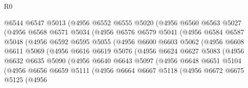 \begin{lexlean}{R0}
\begin{coremodule}
                @6544
                @6547
                @5013
                (@4956
                  @6552
                  @6555
                  @5020
                  (@4956
                    @6560
                    @6563
                    @5027
                    (@4956
                      @6568
                      @6571
                      @5034
                      (@4956
                        @6576
                        @6579
                        @5041
                        (@4956
                          @6584
                          @6587
                          @5048
                          (@4956
                            @6592
                            @6595
                            @5055
                            (@4956
                              @6600
                              @6603
                              @5062
                              (@4956
                                @6608
                                @6611
                                @5069
                                (@4956
                                  @6616
                                  @6619
                                  @5076
                                  (@4956
                                    @6624
                                    @6627
                                    @5083
                                    (@4956
                                      @6632
                                      @6635
                                      @5090
                                      (@4956
                                        @6640
                                        @6643
                                        @5097
                                        (@4956
                                          @6648
                                          @6651
                                          @5104
                                          (@4956
                                            @6656
                                            @6659
                                            @5111
                                            (@4956
                                              @6664
                                              @6667
                                              @5118
                                              (@4956
                                                @6672
                                                @6675
                                                @5125
                                                (@4956

\end{coremodule}
\end{lexlean}
